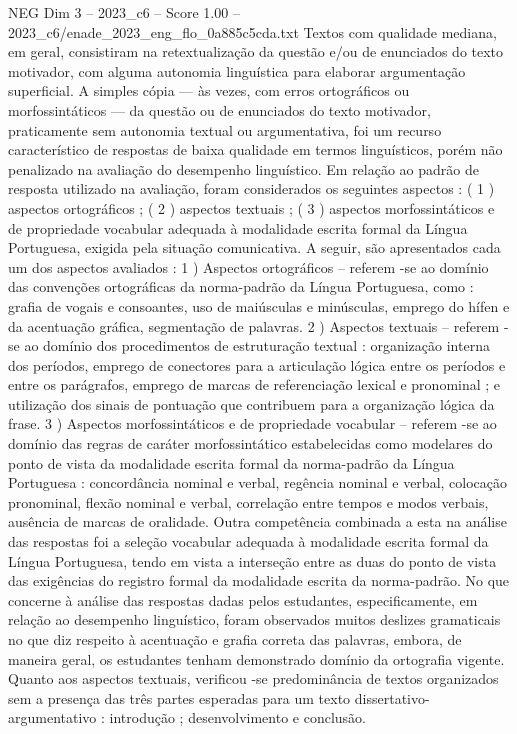 \begin{textsample}{NEG Dim 3 – 2023\_c6 – Score 1.00 – 2023\_c6/enade\_2023\_eng\_flo\_0a885c5cda.txt}
Textos com qualidade mediana, em geral, consistiram na retextualização da questão e/ou de enunciados do texto motivador, com alguma autonomia linguística para elaborar argumentação superficial.
A simples cópia — às vezes, com erros ortográficos ou morfossintáticos — da questão ou de enunciados do texto motivador, praticamente sem autonomia textual ou argumentativa, foi um recurso característico de respostas de baixa qualidade em termos linguísticos, porém não penalizado na avaliação do desempenho linguístico.
Em relação ao padrão de resposta utilizado na avaliação, foram considerados os seguintes aspectos : ( 1 ) aspectos ortográficos ; ( 2 ) aspectos textuais ; ( 3 ) aspectos morfossintáticos e de propriedade vocabular adequada à modalidade escrita formal da Língua Portuguesa, exigida pela situação comunicativa.
A seguir, são apresentados cada um dos aspectos avaliados : 1 ) Aspectos ortográficos – referem -se ao domínio das convenções ortográficas da norma-padrão da Língua Portuguesa, como : grafia de vogais e consoantes, uso de maiúsculas e minúsculas, emprego do hífen e da acentuação gráfica, segmentação de palavras. 2 ) Aspectos textuais – referem -se ao domínio dos procedimentos de estruturação textual : organização interna dos períodos, emprego de conectores para a articulação lógica entre os períodos e entre os parágrafos, emprego de marcas de referenciação lexical e pronominal ; e utilização dos sinais de pontuação que contribuem para a organização lógica da frase. 3 ) Aspectos morfossintáticos e de propriedade vocabular – referem -se ao domínio das regras de caráter morfossintático estabelecidas como modelares do ponto de vista da modalidade escrita formal da norma-padrão da Língua Portuguesa : concordância nominal e verbal, regência nominal e verbal, colocação pronominal, flexão nominal e verbal, correlação entre tempos e modos verbais, ausência de marcas de oralidade.
Outra competência combinada a esta na análise das respostas foi a seleção vocabular adequada à modalidade escrita formal da Língua Portuguesa, tendo em vista a interseção entre as duas do ponto de vista das exigências do registro formal da modalidade escrita da norma-padrão.
No que concerne à análise das respostas dadas pelos estudantes, especificamente, em relação ao desempenho linguístico, foram observados muitos deslizes gramaticais no que diz respeito à acentuação e grafia correta das palavras, embora, de maneira geral, os estudantes tenham demonstrado domínio da ortografia vigente.
Quanto aos aspectos textuais, verificou -se predominância de textos organizados sem a presença das três partes esperadas para um texto dissertativo-argumentativo : introdução ; desenvolvimento e conclusão.

\end{textsample}
